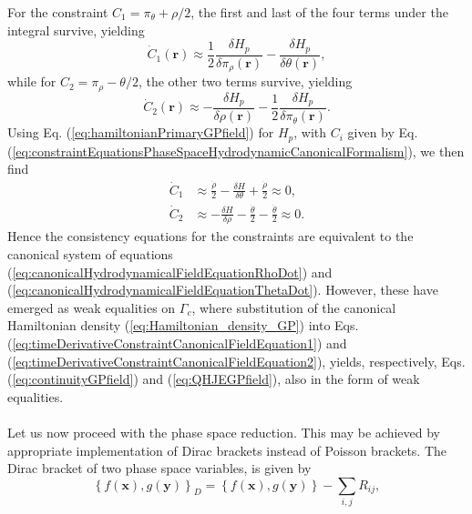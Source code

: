 \documentclass[twocolumn, nofootinbib, nobibnotes, amsmath,amssymb,aps, pra, floatfix]{revtex4-1}
\renewcommand{\v}[1]{\ensuremath{\mathbf{#1}}} %
\begin{document}
For the constraint $C_1=\pi_{\theta}+\rho/2$, the first and last of the four terms under the integral survive, yielding
\begin{equation}
  \dot{C}_1\left( \v{r} \right)\approx\frac{1}{2}\frac{\delta H_p}{\delta\pi_{\rho}(\v{r})}-\frac{\delta H_p}{\delta\theta\left( \v{r} \right)},
  \label{eq:timeDerivativeConstraint1}
\end{equation}
while for $C_2=\pi_{\rho}-\theta/2$, the other two terms survive, yielding
\begin{equation}
  \dot{C}_2\left( \v{r} \right)\approx-\frac{\delta H_p}{\delta\rho\left( \v{r} \right)}-\frac{1}{2}\frac{\delta H_p}{\delta\pi_{\theta}\left( \v{r} \right)}.
  \label{eq:timeDerivativeConstraint2}
\end{equation}
Using Eq. (\ref{eq:hamiltonianPrimaryGPfield}) for $H_p$, with $C_i$ given by Eq. (\ref{eq:constraintEquationsPhaseSpaceHydrodynamicCanonicalFormalism}), we then find
\begin{align}
  \dot{C}_1&\approx\frac{\dot{\rho}}{2}-\frac{\delta H}{\delta\theta}+\frac{\dot{\rho}}{2}\approx0, \label{eq:timeDerivativeConstraintCanonicalFieldEquation1}\\
  \dot{C}_2&\approx-\frac{\delta H}{\delta\rho}-\frac{\dot{\theta}}{2}-\frac{\dot{\theta}}{2}\approx0.
  \label{eq:timeDerivativeConstraintCanonicalFieldEquation2}
\end{align}
Hence the consistency equations for the constraints are equivalent to the canonical system of equations (\ref{eq:canonicalHydrodynamicalFieldEquationRhoDot}) and (\ref{eq:canonicalHydrodynamicalFieldEquationThetaDot}).
However, these have emerged as weak equalities on $\Gamma_c$, where substitution of the canonical Hamiltonian density (\ref{eq:Hamiltonian_density_GP}) into Eqs. (\ref{eq:timeDerivativeConstraintCanonicalFieldEquation1}) and (\ref{eq:timeDerivativeConstraintCanonicalFieldEquation2}), yields, respectively, Eqs. (\ref{eq:continuityGPfield}) and (\ref{eq:QHJEGPfield}), also in the form of weak equalities.\\\\
Let us now proceed with the phase space reduction.
This may be achieved by appropriate implementation of Dirac brackets instead of Poisson brackets. 
The Dirac bracket of two phase space variables, is given by \cite{dirac1958generalized,dirac2001lectures,sundermeyer1982constrained,das2008lectures,burnel2009canonical,rothe2010classical,gitman2012quantization,mitra2014symmetries}
\begin{equation}
  \left\{ f\left( \v{x}\right),g\left( \v{y}  \right) \right\}_D=\left\{ f\left( \v{x} \right),g\left( \v{y} \right) \right\} -\sum_{i,j}R_{ij},  \label{eq:diracBracketDefinitionFields}
\end{equation}
\end{document}
